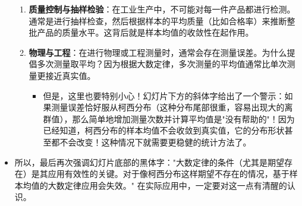 \documentclass[UTF8]{article} %
\begin{document}
\begin{itemize}
\begin{enumerate}[label=\arabic*., itemsep=0.5em]
        \item \textbf{质量控制与抽样检验}：在工业生产中，不可能对每一件产品都进行检测。通常是进行抽样检查，然后根据样本的平均质量（比如合格率）来推断整批产品的质量水平。这背后就是样本均值的收敛性在起作用。
        \item \textbf{物理与工程}：在进行物理或工程测量时，通常会存在测量误差。为什么提倡多次测量取平均？因为根据大数定律，多次测量的平均值通常比单次测量更接近真实值。
            \begin{itemize}[label=\textbullet, itemsep=0.2em]
                \item 但是，这里也要特别小心！幻灯片下方的斜体字给出了一个警示：如果测量误差恰好服从柯西分布（这种分布尾部很重，容易出现大的离群值），那么简单地增加测量次数并计算平均值是"没有帮助的"！因为已经知道，柯西分布的样本均值不会收敛到真实值，它的分布形状甚至都不会改变！这种情况下就需要更稳健的统计方法了。
            \end{itemize}
    \end{enumerate}
    \item 所以，最后再次强调幻灯片底部的黑体字："大数定律的条件（尤其是期望存在）是其应用有效性的关键。对于像柯西分布这样期望不存在的情况，基于样本均值的大数定律应用会失效。" 在实际应用中，一定要对这一点有清醒的认识。
\end{itemize}
\end{document}
